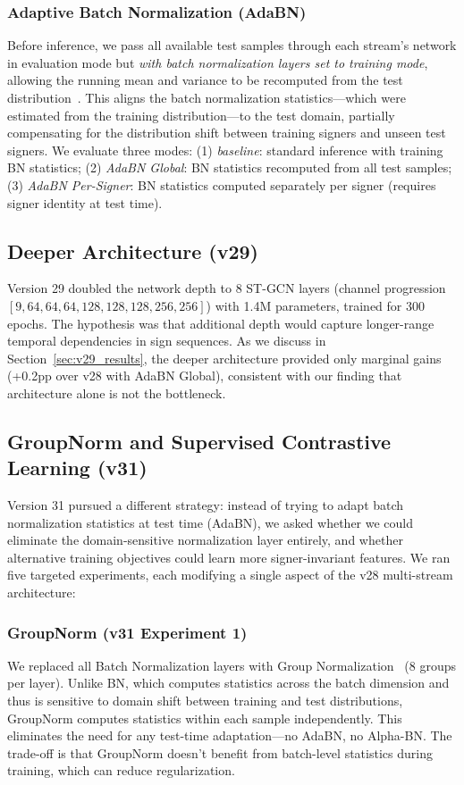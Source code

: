 \documentclass[conference]{IEEEtran}
\begin{document}
\subsubsection{Adaptive Batch Normalization (AdaBN)}
Before inference, we pass all available test samples through each stream's network in evaluation mode but \textit{with batch normalization layers set to training mode}, allowing the running mean and variance to be recomputed from the test distribution~\cite{li2017adabn}. This aligns the batch normalization statistics---which were estimated from the training distribution---to the test domain, partially compensating for the distribution shift between training signers and unseen test signers. We evaluate three modes: (1) \textit{baseline}: standard inference with training BN statistics; (2) \textit{AdaBN Global}: BN statistics recomputed from all test samples; (3) \textit{AdaBN Per-Signer}: BN statistics computed separately per signer (requires signer identity at test time).

\subsection{Deeper Architecture (v29)}

Version 29 doubled the network depth to 8 ST-GCN layers (channel progression $[9, 64, 64, 64, 128, 128, 128, 256, 256]$) with 1.4M parameters, trained for 300 epochs. The hypothesis was that additional depth would capture longer-range temporal dependencies in sign sequences. As we discuss in Section~\ref{sec:v29_results}, the deeper architecture provided only marginal gains (+0.2pp over v28 with AdaBN Global), consistent with our finding that architecture alone is not the bottleneck.

\subsection{GroupNorm and Supervised Contrastive Learning (v31)}
\label{sec:v31_methods}

Version 31 pursued a different strategy: instead of trying to adapt batch normalization statistics at test time (AdaBN), we asked whether we could eliminate the domain-sensitive normalization layer entirely, and whether alternative training objectives could learn more signer-invariant features. We ran five targeted experiments, each modifying a single aspect of the v28 multi-stream architecture:

\subsubsection{GroupNorm (v31 Experiment 1)}
We replaced all Batch Normalization layers with Group Normalization~\cite{wu2018groupnorm} (8 groups per layer). Unlike BN, which computes statistics across the batch dimension and thus is sensitive to domain shift between training and test distributions, GroupNorm computes statistics within each sample independently. This eliminates the need for any test-time adaptation---no AdaBN, no Alpha-BN. The trade-off is that GroupNorm doesn't benefit from batch-level statistics during training, which can reduce regularization.
\end{document}
